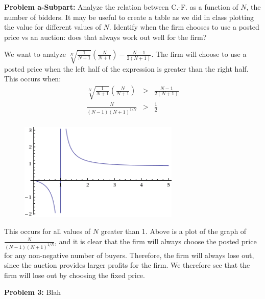 \documentclass[psamsfonts]{amsart}
\newenvironment{sol}{\vspace{0.25cm}{\large \bfseries Solution:}}{\qedsymbol}
\newenvironment{prob}[1]{\begin{framed}{\large \bfseries Problem #1:}}{\end{framed}}
\begin{document}
\begin{prob}{a-Subpart}
Analyze the relation between C.-F. as a function of $N$, the number of bidders. It may be useful to create a table as we did in class plotting the value for different values of $N$. Identify when the firm chooses to use a posted price vs an auction: does that always work out well for the firm?
\end{prob}

\begin{sol}
We want to analyze $\sqrt[N]{\frac{1}{N+1}} \left(\frac{N}{N+1}\right) - \frac{N-1}{2(N+1)}$. The firm will choose to use a posted price when the left half of the expression is greater than the right half. This occurs when:
\begin{eqnarray}
\sqrt[N]{\frac{1}{N+1}} \left(\frac{N}{N+1}\right) &>& \frac{N-1}{2(N+1)} \\
\frac{N}{(N-1)(N+1)^{1/N}} &>& \frac{1}{2} \\
\end{eqnarray}

\begin{figure}[h!]
\includegraphics[width=3in]{ps2_analytical_graph.gif}
\end{figure}

This occurs for all values of $N$ greater than 1. Above is a plot of the graph of $\frac{N}{(N-1)(N+1)^{1/N}}$, and it is clear that the firm will always choose the posted price for any non-negative number of buyers. Therefore, the firm will always lose out, since the auction provides larger profits for the firm. We therefore see that the firm will lose out by choosing the fixed price. 
\end{sol}

\begin{prob}{3}
Blah
\end{prob}
\end{document}
